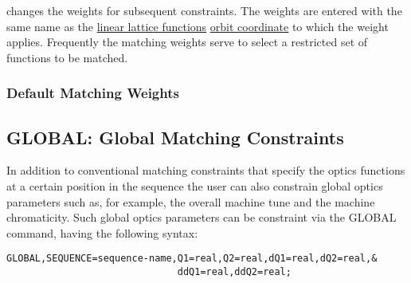 changes the weights for subsequent constraints.
The weights are entered with the same name as the
\href{../Introduction/tables.html#linear}{linear lattice functions}
\href{../Introduction/closed_orbit.html}{orbit coordinate} 
to which the weight applies.
Frequently the matching weights serve to select a restricted
set of functions to be matched.

\subsubsection{Default Matching Weights}


\subsection{GLOBAL: Global Matching Constraints}

In addition to conventional matching constraints that specify the optics 
functions at a certain position in the sequence the user can also constrain 
global optics parameters such as, for example, the overall machine tune
and the machine chromaticity. Such global optics parameters can be
constraint via the  GLOBAL command, having the following syntax:

\begin{verbatim}
GLOBAL,SEQUENCE=sequence-name,Q1=real,Q2=real,dQ1=real,dQ2=real,&
                              ddQ1=real,ddQ2=real;
\end{verbatim}

